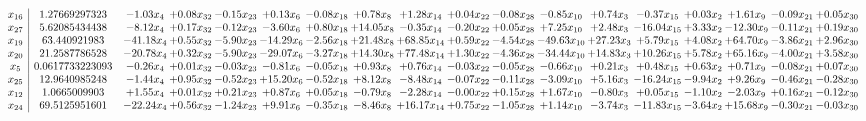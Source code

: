 \documentclass[9pt]{article}
\begin{document}
 \[\begin{array}{c| c c@{\hskip 2pt} c@{\hskip 2pt} c@{\hskip 2pt} c@{\hskip 2pt} c@{\hskip 2pt} c@{\hskip 2pt} c@{\hskip 2pt} c@{\hskip 2pt} c@{\hskip 2pt} c@{\hskip 2pt} c@{\hskip 2pt} c@{\hskip 2pt} c@{\hskip 2pt} c@{\hskip 2pt} c@{\hskip 2pt} c@{\hskip 2pt} }
 x_{16}   &  1.27669297323 & -1.03 x_{4} & +  0.08 x_{32} & -0.15 x_{23} & +  0.13 x_{6} & -0.08 x_{18} & +  0.78 x_{8} & +  1.28 x_{14} & +  0.04 x_{22} & -0.08 x_{28} & -0.85 x_{10} & +  0.74 x_{3} & -0.37 x_{15} & +  0.03 x_{2} & +  1.61 x_{9} & -0.09 x_{21} & +  0.05 x_{30}\\
 x_{27}   &  5.62085434438 & -8.12 x_{4} & +  0.17 x_{32} & -0.12 x_{23} & -3.60 x_{6} & +  0.80 x_{18} & + 14.05 x_{8} & -0.35 x_{14} & -0.20 x_{22} & +  0.05 x_{28} & +  7.25 x_{10} & +  2.48 x_{3} & -16.04 x_{15} & +  3.33 x_{2} & -12.30 x_{9} & -0.11 x_{21} & +  0.19 x_{30}\\
 x_{19}   &  63.440921983 & -41.18 x_{4} & +  0.55 x_{32} & -5.90 x_{23} & -14.29 x_{6} & -2.56 x_{18} & + 21.48 x_{8} & + 68.85 x_{14} & +  0.59 x_{22} & -4.54 x_{28} & -49.63 x_{10} & + 27.23 x_{3} & +  5.79 x_{15} & +  4.08 x_{2} & + 64.70 x_{9} & -3.86 x_{21} & +  2.96 x_{30}\\
 x_{20}   &  21.2587786528 & -20.78 x_{4} & +  0.32 x_{32} & -5.90 x_{23} & -29.07 x_{6} & -3.27 x_{18} & + 14.30 x_{8} & + 77.48 x_{14} & +  1.30 x_{22} & -4.36 x_{28} & -34.44 x_{10} & + 14.83 x_{3} & + 10.26 x_{15} & +  5.78 x_{2} & + 65.16 x_{9} & -4.00 x_{21} & +  3.58 x_{30}\\
 x_{5}   &  0.0617733223093 & -0.26 x_{4} & +  0.01 x_{32} & -0.03 x_{23} & -0.81 x_{6} & -0.05 x_{18} & +  0.93 x_{8} & +  0.76 x_{14} & -0.03 x_{22} & -0.05 x_{28} & -0.66 x_{10} & +  0.21 x_{3} & +  0.48 x_{15} & +  0.63 x_{2} & +  0.71 x_{9} & -0.08 x_{21} & +  0.07 x_{30}\\
 x_{25}   &  12.9640985248 & -1.44 x_{4} & +  0.95 x_{32} & -0.52 x_{23} & + 15.20 x_{6} & -0.52 x_{18} & +  8.12 x_{8} & -8.48 x_{14} & -0.07 x_{22} & -0.11 x_{28} & -3.09 x_{10} & +  5.16 x_{3} & -16.24 x_{15} & -9.94 x_{2} & +  9.26 x_{9} & -0.46 x_{21} & -0.28 x_{30}\\
 x_{12}   &  1.0665009903 & +  1.55 x_{4} & +  0.01 x_{32} & +  0.21 x_{23} & +  0.87 x_{6} & +  0.05 x_{18} & -0.79 x_{8} & -2.28 x_{14} & -0.00 x_{22} & +  0.15 x_{28} & +  1.67 x_{10} & -0.80 x_{3} & +  0.05 x_{15} & -1.10 x_{2} & -2.03 x_{9} & +  0.16 x_{21} & -0.12 x_{30}\\
 x_{24}   &  69.5125951601 & -22.24 x_{4} & +  0.56 x_{32} & -1.24 x_{23} & +  9.91 x_{6} & -0.35 x_{18} & -8.46 x_{8} & + 16.17 x_{14} & +  0.75 x_{22} & -1.05 x_{28} & +  1.14 x_{10} & -3.74 x_{3} & -11.83 x_{15} & -3.64 x_{2} & + 15.68 x_{9} & -0.30 x_{21} & -0.03 x_{30}\\

\end{array}\]
\end{document}
